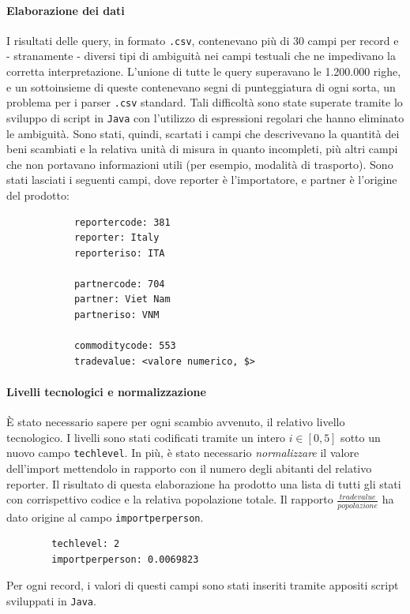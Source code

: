 \documentclass[]{article}
\begin{document}
\begin{multicols}{2}
	\paragraph{Elaborazione dei dati} I risultati delle query, in formato \texttt{.csv}, contenevano più di 30 campi per record e - stranamente - diversi tipi di ambiguità nei campi testuali che ne impedivano la corretta interpretazione. L'unione di tutte le query superavano le 1.200.000 righe, e un sottoinsieme di queste contenevano segni di punteggiatura di ogni sorta, un problema per i parser \texttt{.csv} standard. Tali difficoltà sono state superate tramite lo sviluppo di script in \texttt{Java} con l'utilizzo di espressioni regolari che hanno eliminato le ambiguità. Sono stati, quindi, scartati i campi che descrivevano la quantità dei beni scambiati e la relativa unità di misura in quanto incompleti, più altri campi che non portavano informazioni utili (per esempio, modalità di trasporto). Sono stati lasciati i seguenti campi, dove reporter è l'importatore, e partner è l'origine del prodotto:	
	\begin{center}
		\begin{verbatim}
			reportercode: 381
			reporter: Italy
			reporteriso: ITA
			
			partnercode: 704
			partner: Viet Nam
			partneriso: VNM
			
			commoditycode: 553
			tradevalue: <valore numerico, $>
		\end{verbatim}
	\end{center}

	\paragraph{Livelli tecnologici e normalizzazione} È stato necessario sapere per ogni scambio avvenuto, il relativo livello tecnologico. I livelli sono stati codificati tramite un intero $i \in [0,5]$ sotto un nuovo campo \texttt{techlevel}. In più, è stato necessario \textit{normalizzare} il valore dell'import mettendolo in rapporto con il numero degli abitanti del relativo reporter. Il risultato di questa elaborazione ha prodotto una lista di tutti gli stati con corrispettivo codice e la relativa popolazione totale. Il rapporto $\frac{tradevalue}{popolazione}$ ha dato origine al campo \texttt{importperperson}.
	\begin{center}
		\begin{verbatim}
		techlevel: 2
		importperperson: 0.0069823
		\end{verbatim}
	\end{center}
	Per ogni record, i valori di questi campi sono stati inseriti tramite appositi script sviluppati in \texttt{Java}.
	

\end{multicols}
\end{document}
